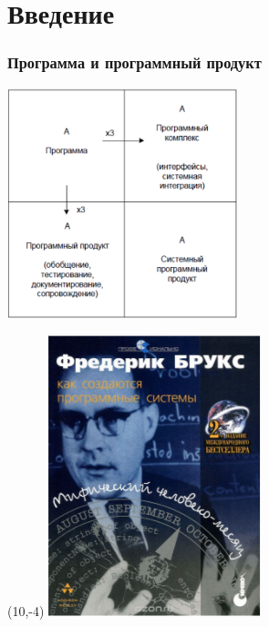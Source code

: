 \documentclass{../../slides-style}
\begin{document}
    \section{Введение}

    \begin{frame}
        \frametitle{Программа и программный продукт}
        \begin{center}
            \includegraphics[width=0.5\textwidth]{brooksSquare.png}
        \end{center}
        \begin{textblock}{2}(10,-4)
            \includegraphics[width=\textwidth]{brooksCover}
        \end{textblock}
    \end{frame}
\end{document}
